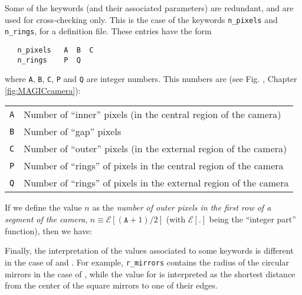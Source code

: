 Some of the keywords (and their associated parameters) are redundant,
and are used for cross-checking only. This is the case of the keywords
\texttt{n\_pixels} and \texttt{n\_rings}, for a \MAGIC definition
file. These entries have the form
%
\begin{verbatim}
   n_pixels   A  B  C
   n_rings    P  Q  
\end{verbatim}
%
where \texttt{A}, \texttt{B}, \texttt{C}, \texttt{P} and \texttt{Q}
are integer numbers. This numbers are (see Fig. , Chapter \ref{fig:MAGICcamera}):\\
%
\begin{center}
\begin{tabular}{cl}
\texttt{A} & Number of ``inner'' pixels (in the central region of
  the camera)\\
\texttt{B} & Number of ``gap'' pixels \\
\texttt{C} & Number of ``outer'' pixels (in the external region of
  the camera)\\
\texttt{P} & Number of ``rings'' of pixels in the central region of 
  the camera\\
\texttt{Q} & Number of ``rings'' of pixels in the external region of 
  the camera\\
\end{tabular}
\end{center}
%
If we define the value $n$ as the \emph{number of outer pixels in the
  first row of a segment of the camera}, $ n \equiv
\mathcal{E}[(\texttt{A}+1)/2]$ (with $\mathcal{E}[\mathord{.}]$ being
the ``integer part'' function), then we have:
%
\calcnpixelseq

Finally, the interpretation of the values associated to some keywords
is different in the case of \MAGIC and \CTuno. For example,
\texttt{r\_mirrors} contains the radius of the circular mirrors in the
case of \CTuno, while the value for \MAGIC is interpreted as the
shortest distance from the center of the square mirrors to one of
their edges.

